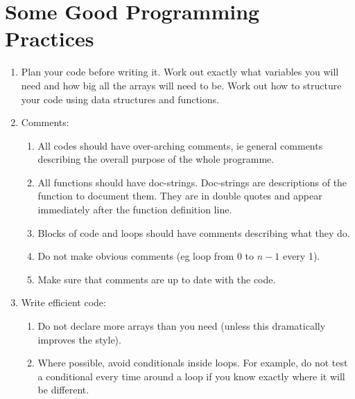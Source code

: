 \section{Some Good Programming Practices}\label{sec:goodCode}

\begin{enumerate}
\item Plan your code before writing it. Work out exactly what variables you will need and how big all the arrays will need to be. Work out how to structure your code using data structures and functions.
\item Comments:
    \begin{enumerate}
    \item All codes should have over-arching comments, ie general comments describing the overall purpose of the whole programme. 
    \item All functions should have doc-strings. Doc-strings are descriptions of the function to document them. They are in double quotes and appear immediately after the function definition line. 
    \item Blocks of code and loops should have comments describing what they do.
    \item Do not make obvious comments (eg loop from 0 to $n-1$ every 1).
    \item Make sure that comments are up to date with the code.
    \end{enumerate}

\item Write efficient code:
    \begin{enumerate}
    \item Do not declare more arrays than you need (unless this dramatically improves the style).
    \item Where possible, avoid conditionals inside loops. For example, do not test a conditional every time around a loop if you know exactly where it will be different.
    

\end{enumerate}
\end{enumerate}
